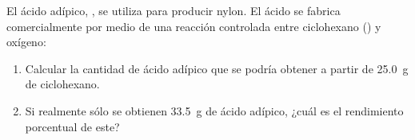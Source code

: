 El ácido adípico, , se utiliza para producir nylon. El ácido se fabrica comercialmente por medio de una reacción controlada entre ciclohexano () y oxígeno:
\begin{enumerate}[label={\alph*)},font={\color{red!50!black}\bfseries}]
	\item Calcular la cantidad de ácido adípico que se podría obtener a partir de \SI{25,0}{\gram} de ciclohexano.
	\item Si realmente sólo se obtienen \SI{33,5}{\gram} de ácido adípico, ¿cuál es el rendimiento porcentual de este?
\end{enumerate}
